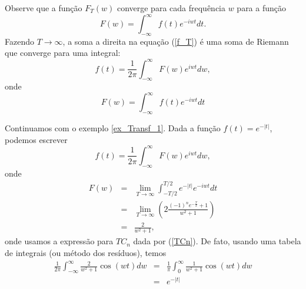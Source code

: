 Observe que a função $F_T(w)$ converge para cada frequência $w$ para a função 
$$
F(w)=\int_{-\infty}^\infty f(t) e^{-iw t}dt.
$$
Fazendo $T\to \infty$, a soma a direita na equação (\ref{f_T}) é uma soma de Riemann que converge para uma integral:
$$
f(t)=\frac{1}{2\pi} \int_{-\infty}^\infty F(w)e^{iw t}dw,
$$
onde
$$F(w)=\int_{-\infty}^{\infty}f(t)e^{-i w t}dt$$
\begin{ex} Continuamos com o exemplo \ref{ex_Transf_1}. Dada a função $f(t)=e^{-|t|}$, podemos escrever
$$
f(t)=\frac{1}{2\pi} \int_{-\infty}^\infty F(w)e^{iw t}dw,
$$
onde
\begin{eqnarray*}
F(w)&=&\lim_{T\to\infty}\int_{-T/2}^{T/2}e^{-|t|} e^{-i w t}dt\\
&=&\lim_{T\to\infty}\left(2\frac{ (-1)^ne^{-\frac{T}{2}}+1}{w^2+1} \right)\\
&=&\frac{2}{w^2+1},
\end{eqnarray*}
onde usamos a expressão para $TC_n$ dada por (\ref{TCn}). De fato, usando uma tabela de integrais (ou método dos resíduos), temos
\begin{eqnarray}
\frac{1}{2\pi} \int_{-\infty}^\infty \frac{2}{w^2+1} \cos(wt)dw
&=&\frac{1}{\pi} \int_{0}^\infty \frac{1}{w^2+1} \cos(wt)dw\\
&=&e^{-|t|}
\end{eqnarray}
\end{ex}
